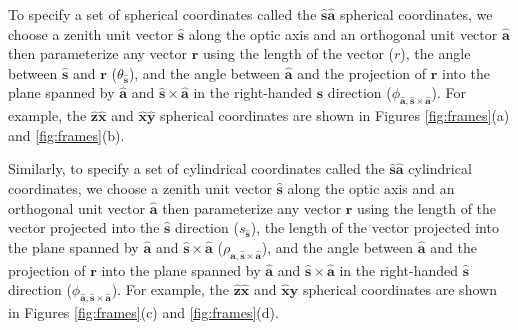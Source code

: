 \documentclass[11pt]{article}
\providecommand{\mb}[1]{\mathbf{#1}}
\providecommand{\mh}[1]{\mathbf{\hat{#1}}}
\begin{document}
To specify a set of spherical coordinates called the $\mb{\hat{s}}\mb{\hat{a}}$
spherical coordinates, we choose a zenith unit vector $\mb{\hat{s}}$ along the
optic axis and an orthogonal unit vector $\mb{\hat{a}}$ then parameterize any
vector $\mb{r}$ using the length of the vector ($r$), the angle between
$\mb{\hat{s}}$ and $\mb{r}$ ($\theta_{\mb{\hat{s}}}$), and the angle between
$\mb{\hat{a}}$ and the projection of $\mb{r}$ into the plane spanned by
$\mb{\hat{a}}$ and $\mb{\hat{s}} \times \mb{\hat{a}}$ in the right-handed
$\mb{\hat{s}}$ direction ($\phi_{\mb{\hat{a}},\mb{\hat{s}}\times\mb{\hat{a}}}$).
For example, the $\mb{\hat{z}}\mb{\hat{x}}$ and $\mb{\hat{x}}\mb{\hat{y}}$
spherical coordinates are shown in Figures \ref{fig:frames}(a) and
\ref{fig:frames}(b).

Similarly, to specify a set of cylindrical coordinates called the
$\mb{\hat{s}}\mb{\hat{a}}$ cylindrical coordinates, we choose a zenith unit
vector $\mb{\hat{s}}$ along the optic axis and an orthogonal unit vector $\mb{\hat{a}}$ then
parameterize any vector $\mb{r}$ using the length of the vector projected into
the $\mb{\hat{s}}$ direction ($s_{\mh{s}}$), the length of the vector projected into the
plane spanned by $\mb{\hat{a}}$ and $\mb{\hat{s}} \times \mb{\hat{a}}$
($\rho_{\mb{\hat{a}},\mb{\hat{s}}\times\mb{\hat{a}}}$), and the angle between
$\mb{\hat{a}}$ and the projection of $\mb{r}$ into the plane spanned by
$\mb{\hat{a}}$ and $\mb{\hat{s}} \times \mb{\hat{a}}$ in the right-handed
$\mb{\hat{s}}$ direction ($\phi_{\mb{\hat{a}},\mb{\hat{s}}\times\mb{\hat{a}}}$).
For example, the $\mb{\hat{z}}\mb{\hat{x}}$ and $\mb{\hat{x}}\mb{\hat{y}}$
spherical coordinates are shown in Figures \ref{fig:frames}(c) and
\ref{fig:frames}(d).

\end{document}
